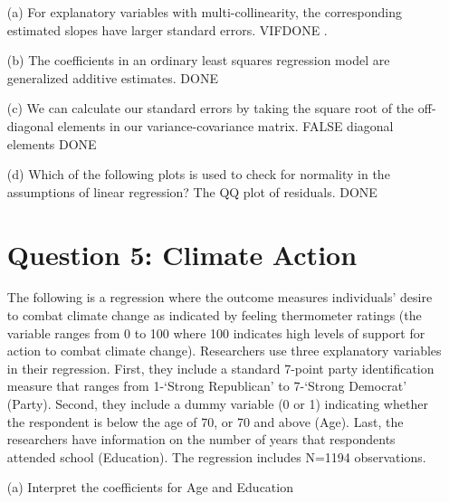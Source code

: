 \documentclass[12pt,letterpaper]{article}
\begin{document}
{\begin{enumerate}
\begin{verbatim}
			\end{verbatim}
			\newpage
			\section*{Question 4:Multiple Choice DONE}
			\item [(a)] For explanatory variables with multi-collinearity, the corresponding estimated slopes have
			larger standard errors.
			VIFDONE .
			
			\item [(b)] The coefficients in an ordinary least squares regression model are generalized additive estimates.
			DONE 
			
			\item [(c)] We can calculate our standard errors by taking the square root of the off-diagonal elements
			in our variance-covariance matrix.
			FALSE
			diagonal elements DONE
			
			\item [(d)] Which of the following plots is used to check for normality in the assumptions of linear
			regression?
			The QQ plot of residuals.
			DONE
			
			\vspace{.5cm}
			\newpage
			\section*{Question 5: Climate Action}
			The following is a regression where the outcome measures individuals’ desire to combat
			climate change as indicated by feeling thermometer ratings (the variable ranges from 0 to 100
			where 100 indicates high levels of support for action to combat climate change). Researchers
			use three explanatory variables in their regression. First, they include a standard 7-point
			party identification measure that ranges from 1-‘Strong Republican’ to 7-‘Strong Democrat’
			(Party). Second, they include a dummy variable (0 or 1) indicating whether the respondent
			is below the age of 70, or 70 and above (Age). Last, the researchers have information on
			the number of years that respondents attended school (Education). The regression includes
			N=1194 observations.
			
			\item [(a)]  Interpret the coefficients for Age and Education
			
			
			\begin{verbatim}
				
				
				

\end{verbatim}
\end{enumerate}}
\end{document}
